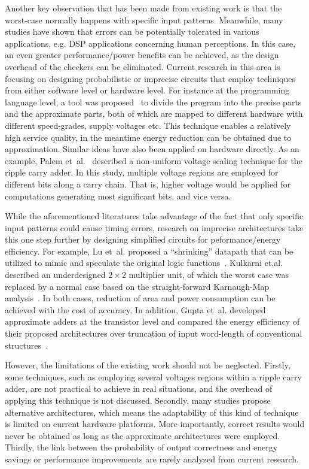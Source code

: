 \documentclass[journal]{IEEEtran}
\begin{document}
Another key observation that has been made from existing work is that the worst-case normally happens with specific input patterns. Meanwhile, many studies have shown that errors can be potentially tolerated in various applications, e.g. DSP applications concerning human perceptions. In this case, an even greater performance/power benefits can be achieved, as the design overhead of the checkers can be eliminated. Current research in this area is focusing on designing probabilistic or imprecise circuits that employ techniques from either software level or hardware level. For instance at the programming language level, a tool was proposed~\cite{EnerJ2011Uwash,Truffle2012Uwash} to divide the program into the precise parts and the approximate parts, both of which are mapped to different hardware with different speed-grades, supply voltages etc. This technique enables a relatively high service quality, in the meantime energy reduction can be obtained due to approximation. Similar ideas have also been applied on hardware directly. As an example, Palem et~al.~\cite{NonUniformScaling} described a non-uniform voltage scaling technique for the ripple carry adder. In this study, multiple voltage regions are employed for different bits along a carry chain. That is, higher voltage would be applied for computations generating most significant bits, and vice versa.

While the aforementioned literatures take advantage of the fact that only specific input patterns could cause timing errors, research on imprecise architectures take this one step further by designing simplified circuits for peformance/energy efficiency. For example, Lu et~al. proposed a ``shrinking'' datapath that can be utilized to mimic and speculate the original logic functions~\cite{IntelSpeeding}. Kulkarni et.al. described an underdesigned $2\times2$ multiplier unit, of which the worst case was replaced by a normal case based on the straight-forward Karnaugh-Map analysis~\cite{Undersigned2x2multiplier}. In both cases, reduction of area and power consumption can be achieved with the cost of accuracy. In addition, Gupta et~al. developed approximate adders at the transistor level and compared the energy efficiency of their proposed architectures over truncation of input word-length of conventional structures~\cite{Gupta2013TransCADICS}.

However, the limitations of the existing work should not be neglected. Firstly, some techniques, such as employing several voltages regions within a ripple carry adder, are not practical to achieve in real situations, and the overhead of applying this technique is not discussed. Secondly, many studies propose alternative architectures, which means the adaptability of this kind of technique is limited on current hardware platforms. More importantly, correct results would never be obtained as long as the approximate architectures were employed. Thirdly, the link between the probability of output correctness and energy savings or performance improvements are rarely analyzed from current research.
\end{document}
